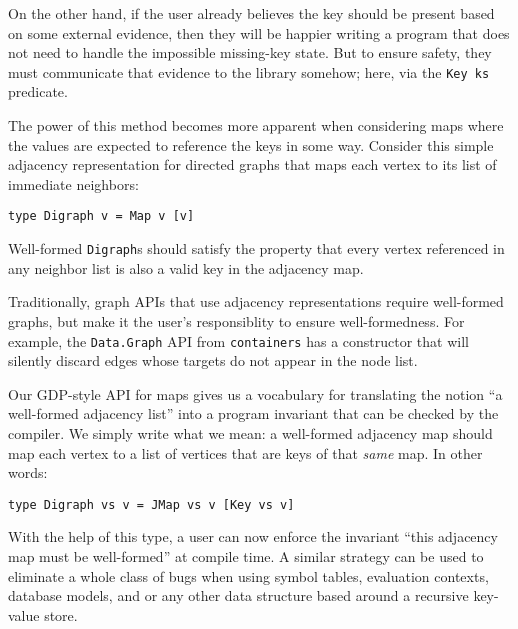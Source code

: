 \documentclass[format=sigplan, review=false, screen=true]{acmart}
\makeatletter
\let\origsubsection\subsection
\renewcommand\subsection{\@ifstar{\starsubsection}{\nostarsubsection}}
\newcommand\nostarsubsection[1]
{\subsectionprelude\origsubsection{#1}\subsectionpostlude}
\newcommand\starsubsection[1]
{\subsectionprelude\origsubsection*{#1}\subsectionpostlude}
\newcommand\subsectionprelude{%
  \vspace{-0.25em}
}
\newcommand\subsectionpostlude{%
  \vspace{-0.05em}
}
\makeatother
\begin{document}
On the other hand, if the user already believes the key should be present based on some
external evidence, then they will be happier writing a program that does not need to handle
the impossible missing-key state. But to ensure safety, they must communicate that evidence to the library
somehow; here, via the \texttt{Key ks} predicate.

\subsection{Application: well-formed adjacency lists}

The power of this method becomes more apparent when considering maps where
the values are expected to reference the keys in some way. Consider this
simple adjacency representation for directed graphs that maps each vertex to its list of immediate neighbors:
\begin{verbatim}
type Digraph v = Map v [v]
\end{verbatim}
Well-formed \texttt{Digraph}s
should satisfy the property that every vertex referenced in any neighbor list is also
a valid key in the adjacency map.

Traditionally, graph APIs that use adjacency representations require well-formed
graphs, but make it the user's responsiblity to ensure well-formedness. For example,
the \texttt{Data.Graph} API from \texttt{containers} has a constructor that
will silently discard edges whose targets do not appear in the node list.

Our GDP-style API for maps gives us a vocabulary for
translating the notion ``a well-formed adjacency list'' into a program invariant that can
be checked by the compiler. We simply write what we mean: a well-formed adjacency
map should map each vertex to a list of vertices that are keys of that \emph{same} map.
In other words:
\begin{verbatim}
type Digraph vs v = JMap vs v [Key vs v]
\end{verbatim}
With the help of this type, a user can now enforce the invariant ``this adjacency map
must be well-formed'' at compile time. A similar strategy can be used to eliminate a
whole class of bugs when using symbol tables, evaluation contexts,
database models, and or any other data structure based around a recursive key-value store.
\end{document}
